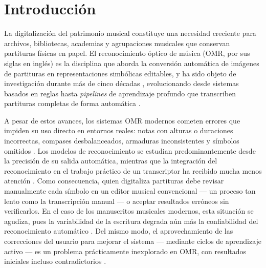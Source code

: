 \maketitle

\section{Introducci\'on}

La digitalizaci\'on del patrimonio musical constituye una necesidad
creciente para archivos, bibliotecas, academias y agrupaciones musicales
que conservan partituras f\'isicas en papel. El reconocimiento \'optico de
m\'usica (OMR, por sus siglas en ingl\'es) es la disciplina que aborda la
conversi\'on autom\'atica de im\'agenes de partituras en representaciones
simb\'olicas editables, y ha sido objeto de investigaci\'on durante m\'as de
cinco d\'ecadas \cite{omr2020}, evolucionando desde sistemas basados en
reglas hasta \emph{pipelines} de aprendizaje profundo que transcriben
partituras completas de forma autom\'atica
\cite{rebelo2012}\cite{calvo2018}\cite{riosvila2026}.

A pesar de estos avances, los sistemas OMR modernos cometen errores que
impiden su uso directo en entornos reales: notas con alturas o duraciones
incorrectas, compases desbalanceados, armaduras inconsistentes y s\'imbolos
omitidos \cite{calvo2018}. Los modelos de reconocimiento se estudian
predominantemente desde la precisi\'on de su salida autom\'atica, mientras
que la integraci\'on del reconocimiento en el trabajo pr\'actico de un
transcriptor ha recibido mucha menos atenci\'on \cite{rizo2023}. Como
consecuencia, quien digitaliza partituras debe revisar manualmente cada
s\'imbolo en un editor musical convencional --- un proceso tan lento como la
transcripci\'on manual --- o aceptar resultados err\'oneos sin verificarlos.
En el caso de los manuscritos musicales modernos, esta situaci\'on se
agudiza, pues la variabilidad de la escritura degrada a\'un m\'as la
confiabilidad del reconocimiento autom\'atico \cite{ricordi2024}. Del mismo
modo, el aprovechamiento de las correcciones del usuario para mejorar el
sistema --- mediante ciclos de aprendizaje activo --- es un problema
pr\'acticamente inexplorado en OMR, con resultados iniciales incluso
contradictorios \cite{mlsp2025}.

